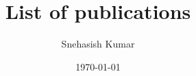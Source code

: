\documentclass[12pt]{article}
\title{List of publications}
\author{Snehasish Kumar}
\date{\today}
\begin{document}
\maketitle %
\vspace{10pt}

\nocite{amoeba,protozoa,mici,sqrl}



\end{document}
